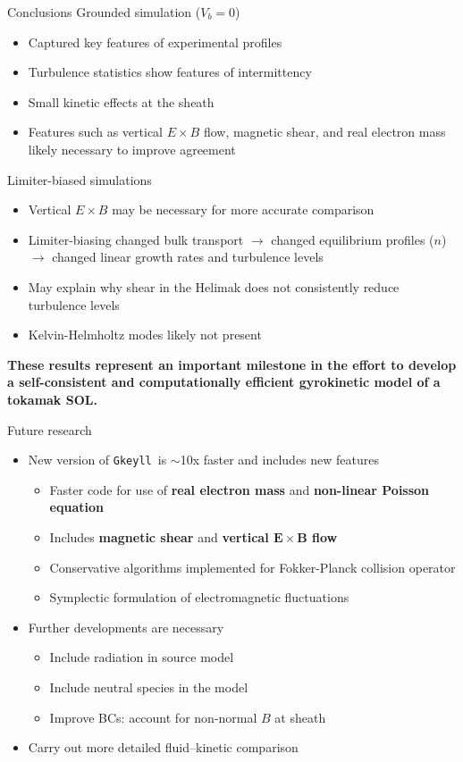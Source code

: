 \documentclass[12pt,table]{beamer}
\newcommand{\etal}{\emph{et al.}}
\newcommand{\gke}{{\tt Gkeyll}}
\begin{document}
\begin{frame}{Conclusions}
    Grounded simulation ($V_b = 0$)
    \begin{itemize} \footnotesize
        \item Captured key features of experimental profiles
        \item Turbulence statistics show features of intermittency
        \item Small kinetic effects at the sheath
        \item Features such as vertical $E \times B$ flow, magnetic shear, and real electron mass likely necessary to improve agreement
    \end{itemize}
    Limiter-biased simulations
    \begin{itemize} \footnotesize
        \item Vertical $E \times B$ may be necessary for more accurate comparison
        \item Limiter-biasing changed bulk transport $\rightarrow$ changed equilibrium profiles ($n$) $\rightarrow$ changed linear growth rates and turbulence levels
        \item May explain why shear in the Helimak does not consistently reduce turbulence levels%
        \item Kelvin-Helmholtz modes likely not present
    \end{itemize}
    {\bf \small These results represent an important milestone in the effort to develop a self-consistent and computationally efficient gyrokinetic model of a tokamak SOL.}
\end{frame}

\begin{frame}{Future research}
    \begin{itemize}
        \item New version of \gke\ is $\sim$10x faster and includes new features
        \begin{itemize}
        \item Faster code for use of {\bf real electron mass} and {\bf non-linear Poisson equation}
        \item Includes {\bf magnetic shear} and {\bf vertical $\bm{E}\times \bm{B}$ flow}
        \item Conservative algorithms implemented for Fokker-Planck collision operator
        \item Symplectic formulation of electromagnetic fluctuations
        \end{itemize}
        \item Further developments are necessary
        \begin{itemize}
            \item Include radiation in source model
            \item Include neutral species in the model
            \item Improve BCs: account for non-normal $B$ at sheath
        \end{itemize}
        \item Carry out more detailed fluid--kinetic comparison
    \end{itemize}
\end{frame}
\end{document}
